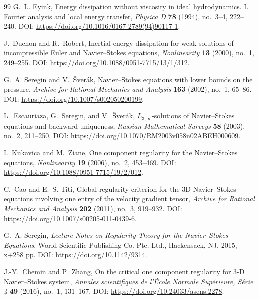 \documentclass[11pt]{article}
\numberwithin{equation}{section}
\theoremstyle{plain}
\theoremstyle{definition}
\theoremstyle{remark}
\begin{document}
\begin{thebibliography}{99}
G.~L. Eyink,
\newblock Energy dissipation without viscosity in ideal hydrodynamics. I. Fourier analysis and local energy transfer,
\newblock \emph{Physica D} \textbf{78} (1994), no.~3--4, 222--240.
\newblock DOI: \url{https://doi.org/10.1016/0167-2789(94)90117-1}.

J.~Duchon and R.~Robert,
\newblock Inertial energy dissipation for weak solutions of incompressible Euler and Navier--Stokes equations,
\newblock \emph{Nonlinearity} \textbf{13} (2000), no.~1, 249--255.
\newblock DOI: \url{https://doi.org/10.1088/0951-7715/13/1/312}.

G.~A. Seregin and V.~\v{S}ver\'ak,
\newblock Navier--Stokes equations with lower bounds on the pressure,
\newblock \emph{Archive for Rational Mechanics and Analysis} \textbf{163} (2002), no.~1, 65--86.
\newblock DOI: \url{https://doi.org/10.1007/s002050200199}.

L.~Escauriaza, G.~Seregin, and V.~\v{S}ver\'ak,
\newblock $L_{3,\infty}$-solutions of Navier--Stokes equations and backward uniqueness,
\newblock \emph{Russian Mathematical Surveys} \textbf{58} (2003), no.~2, 211--250.
\newblock DOI: \url{https://doi.org/10.1070/RM2003v058n02ABEH000609}.

I.~Kukavica and M.~Ziane,
\newblock One component regularity for the Navier--Stokes equations,
\newblock \emph{Nonlinearity} \textbf{19} (2006), no.~2, 453--469.
\newblock DOI: \url{https://doi.org/10.1088/0951-7715/19/2/012}.

C.~Cao and E.~S. Titi,
\newblock Global regularity criterion for the 3D Navier--Stokes equations involving one entry of the velocity gradient tensor,
\newblock \emph{Archive for Rational Mechanics and Analysis} \textbf{202} (2011), no.~3, 919--932.
\newblock DOI: \url{https://doi.org/10.1007/s00205-011-0439-6}.

G.~A. Seregin,
\newblock \emph{Lecture Notes on Regularity Theory for the Navier--Stokes Equations},
\newblock World Scientific Publishing Co. Pte. Ltd., Hackensack, NJ, 2015, x+258 pp.
\newblock DOI: \url{https://doi.org/10.1142/9314}.

J.-Y.~Chemin and P.~Zhang,
\newblock On the critical one component regularity for 3-D Navier--Stokes system,
\newblock \emph{Annales scientifiques de l'\'{E}cole Normale Sup\'{e}rieure, S\'{e}rie 4} \textbf{49} (2016), no.~1, 131--167.
\newblock DOI: \url{https://doi.org/10.24033/asens.2278}.


\end{thebibliography}
\end{document}

